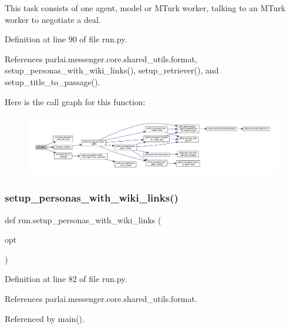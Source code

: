 \begin{DoxyVerb}This task consists of one agent, model or MTurk worker, talking to an
MTurk worker to negotiate a deal.
\end{DoxyVerb}
 

Definition at line 90 of file run.\+py.



References parlai.\+messenger.\+core.\+shared\+\_\+utils.\+format, setup\+\_\+personas\+\_\+with\+\_\+wiki\+\_\+links(), setup\+\_\+retriever(), and setup\+\_\+title\+\_\+to\+\_\+passage().

Here is the call graph for this function\+:
\nopagebreak
\begin{figure}[H]
\begin{center}
\leavevmode
\includegraphics[width=350pt]{namespacerun_aa82b870a20fb0f19feebf9c895b0cfd9_cgraph}
\end{center}
\end{figure}
\mbox{\label{namespacerun_a4f4e30a0127c995cc883fd747c4eea15}} 
\subsubsection{\texorpdfstring{setup\+\_\+personas\+\_\+with\+\_\+wiki\+\_\+links()}{setup\_personas\_with\_wiki\_links()}}
{\footnotesize\ttfamily def run.\+setup\+\_\+personas\+\_\+with\+\_\+wiki\+\_\+links (\begin{DoxyParamCaption}\item[{}]{opt }\end{DoxyParamCaption})}



Definition at line 82 of file run.\+py.



References parlai.\+messenger.\+core.\+shared\+\_\+utils.\+format.



Referenced by main().

